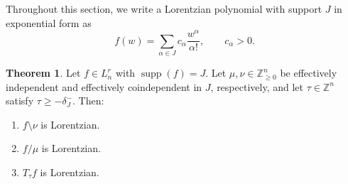 \documentclass[11pt]{article}
\theoremstyle{definition}
\newtheorem{theorem}{Theorem}[section]
\theoremstyle{remark}
\newcommand{\Zgeqn}{\mathbb{Z}_{\geq 0}^n}     %
\newcommand{\delminus}{\delta_J^-}
\DeclareMathOperator{\supp}{supp}
\newcommand{\Lnr}{L_n^r}
\begin{document}
Throughout this section, we write a Lorentzian polynomial with support $J$ in exponential form as
\[
    f(w)=\sum_{\alpha\in J} c_\alpha \frac{w^\alpha}{\alpha!},
    \qquad c_\alpha>0.
\]

\begin{theorem}\label{thm:embedded_minor_of_lorentzian_works}
    Let $f\in\Lnr$ with $\supp(f)=J$. Let $\mu,\nu\in\Zgeqn$ be effectively independent and effectively coindependent in $J$, respectively, and let $\tau\in\mathbb{Z}^n$ satisfy $\tau\geq-\delminus$. Then:
    \begin{enumerate}
        \item $f\setminus\nu$ is Lorentzian.
        \item $f/\mu$ is Lorentzian.
        \item $T_\tau f$ is Lorentzian.
    \end{enumerate}
\end{theorem}
\end{document}

